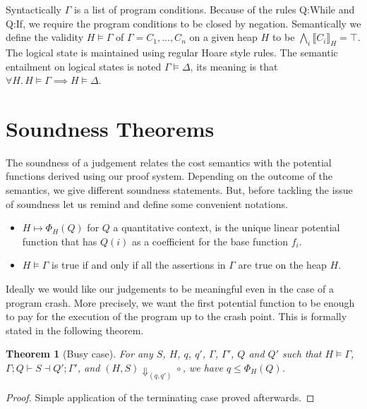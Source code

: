 \documentclass[nocopyrightspace,preprint]{sigplanconf}
\newtheorem{theorem}{Theorem}
\begin{document}
Syntactically $\Gamma$ is a list of program conditions.  Because of the
rules {\sc Q:While} and {\sc Q:If}, we require the program conditions
to be closed by negation.  Semantically we define the validity
$H \models \Gamma$ of $\Gamma = C_1, \dots, C_n$ on a given
heap $H$ to be $\bigwedge_i \llbracket C_i \rrbracket_H = \top$.
%
The logical state
is maintained using regular Hoare style rules.
The semantic entailment on logical states is noted $\Gamma \models \Delta$,
its meaning is that $\forall H.\, H\models\Gamma \implies H\models\Delta$.


\section{Soundness Theorems}

The soundness of a judgement relates the cost semantics with the potential
functions derived using our proof system.  Depending on the outcome of
the semantics, we give different soundness statements.
But, before tackling the issue of soundness let us remind and define some
convenient notations.
\begin{itemize}
\item $H \mapsto \Phi_H(Q)$ for $Q$ a quantitative context, is the
unique linear potential function that has $Q(i)$ as a coefficient for the
base function $f_i$.
\item $H \models \Gamma$ is true if and only if all the assertions in
$\Gamma$ are true on the heap $H$.
\end{itemize}

Ideally we would
like our judgements to be meaningful even in the case of a program
crash.  More precisely, we want the first potential function to be enough
to pay for the execution of the program up to the crash point.  This is
formally stated in the following theorem.

\begin{theorem}[Busy case]
For any $S$, $H$, $q$, $q'$, $\Gamma$, $\Gamma'$, $Q$ and $Q'$
such that $H \models \Gamma$, $\Gamma; Q \vdash S \dashv Q'; \Gamma'$,
  and $(H, S) \Downarrow_{(q,q')} \circ$,
we have $q \le \Phi_H(Q)$.
\end{theorem}
\begin{proof}
Simple application of the terminating case proved afterwards.
\end{proof}
\end{document}
